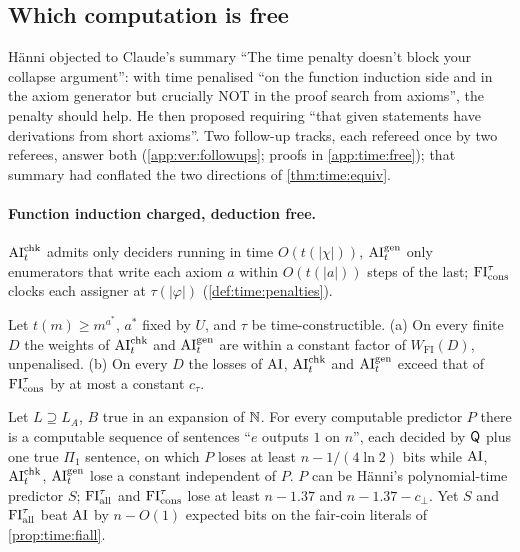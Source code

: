 \subsection{Which computation is free}\label{sec:time:free}

H\"anni objected to Claude's summary ``The time penalty doesn't block your collapse argument'': with time penalised ``on the function induction side and in the axiom generator but crucially NOT in the proof search from axioms'', the penalty should help. He then proposed requiring ``that given statements have derivations from short axioms''. Two follow-up tracks, each refereed once by two referees, answer both (\cref{app:ver:followups}; proofs in \cref{app:time:free}); that summary had conflated the two directions of \cref{thm:time:equiv}.

\paragraph{Function induction charged, deduction free.} $\mathrm{AI}^{\mathrm{chk}}_t$ admits only deciders running in time $O(t(|\chi|))$, $\mathrm{AI}^{\mathrm{gen}}_t$ only enumerators that write each axiom $a$ within $O(t(|a|))$ steps of the last; $\mathrm{FI}_{\mathrm{cons}}^\tau$ clocks each assigner at $\tau(|\varphi|)$ (\cref{def:time:penalties}).

\begin{theorem}\label{thm:time:onesided}
Let $t(m)\ge m^{a^*}$, $a^*$ fixed by $U$, and $\tau$ be time-constructible. (a) On every finite $D$ the weights of $\mathrm{AI}^{\mathrm{chk}}_t$ and $\mathrm{AI}^{\mathrm{gen}}_t$ are within a constant factor of $W_{\mathrm{FI}}(D)$, unpenalised. (b) On every $D$ the losses of $\mathrm{AI}$, $\mathrm{AI}^{\mathrm{chk}}_t$ and $\mathrm{AI}^{\mathrm{gen}}_t$ exceed that of $\mathrm{FI}_{\mathrm{cons}}^\tau$ by at most a constant $c_\tau$.
\end{theorem}

\begin{theorem}\label{thm:time:diagonal}
Let $L\supseteq L_A$, $B$ true in an expansion of $\mathbb{N}$. For every computable predictor $P$ there is a computable sequence of sentences ``$e$ outputs $1$ on $n$'', each decided by $\mathsf{Q}$ plus one true $\Pi_1$ sentence, on which $P$ loses at least $n-1/(4\ln2)$ bits while $\mathrm{AI}$, $\mathrm{AI}^{\mathrm{chk}}_t$, $\mathrm{AI}^{\mathrm{gen}}_t$ lose a constant independent of $P$. $P$ can be H\"anni's polynomial-time predictor $S$; $\mathrm{FI}_{\mathrm{all}}^\tau$ and $\mathrm{FI}_{\mathrm{cons}}^\tau$ lose at least $n-1.37$ and $n-1.37-c_\perp$. Yet $S$ and $\mathrm{FI}_{\mathrm{all}}^\tau$ beat $\mathrm{AI}$ by $n-O(1)$ expected bits on the fair-coin literals of \cref{prop:time:fiall}.
\end{theorem}

